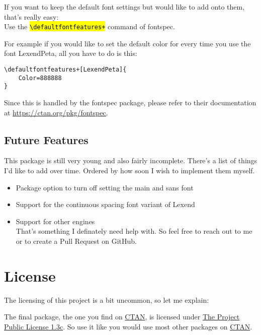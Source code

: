\documentclass[oneside,a4paper]{ltxdoc}
\DeclareRobustCommand{\code}[1]{{\sethlcolor{lightgray}\texttt{\hl{#1}}}}
\providecommand{\tightlist}{%
  \setlength{\itemsep}{0pt}\setlength{\parskip}{0pt}}
\begin{document}
If you want to keep the default font settings but would like to add onto them, that's really easy:\\
Use the \code{\textbackslash{}defaultfontfeatures+} command of \textsf{fontspec}.

\bigskip

For example if you would like to set the default color for every time you use the font
\textsf{LexendPeta}, all you have to do is this:

\begin{lstlisting}[language={[LaTeX]TeX}]
\defaultfontfeatures+[LexendPeta]{
	Color=888888
}
\end{lstlisting}

Since this is handled by the \textsf{fontspec} package, please refer to their documentation at
\url{https://ctan.org/pkg/fontspec}.

\subsection{Future Features}

This package is still very young and also fairly incomplete. There's a list of things I'd like to
add over time. Ordered by how soon I wish to implement them myself.

\begin{itemize}
\item Package option to turn off setting the main and sans font\tightlist
\item Support for the continuous spacing font variant of Lexend\tightlist
\item Support for other  engines\\
	That's something I definately need help with. So feel free to reach out to me or to create a
	Pull Request on GitHub.\tightlist
\end{itemize}

\section{License}

The licensing of this project is a bit uncommon, so let me explain:

The final package, the one you find on \href{https://ctan.org/}{CTAN}, is licensed under
\href{https://ctan.org/license/lppl1.3c}{The  Project Public License 1.3c}. So use it
like you would use most other packages on \href{https://ctan.org/}{CTAN}.
\end{document}
